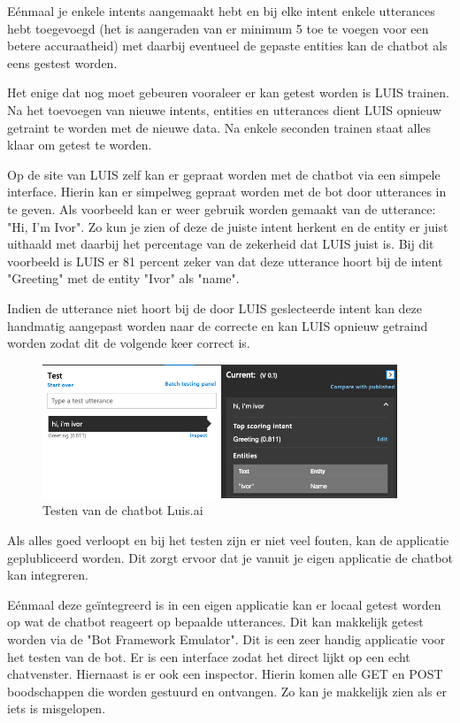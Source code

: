 Eénmaal je enkele intents aangemaakt hebt en bij elke intent enkele utterances hebt toegevoegd (het is aangeraden van er minimum 5 toe te voegen voor een betere accuraatheid) met daarbij eventueel de gepaste entities kan de chatbot als eens gestest worden.

Het enige dat nog moet gebeuren vooraleer er kan getest worden is LUIS trainen. Na het toevoegen van nieuwe intents, entities en utterances dient LUIS opnieuw getraint te worden met de nieuwe data. Na enkele seconden trainen staat alles klaar om getest te worden.

Op de site van LUIS zelf kan er gepraat worden met de chatbot via een simpele interface. Hierin kan er simpelweg gepraat worden met de bot door utterances in te geven. Als voorbeeld kan er weer gebruik worden gemaakt van de utterance: "Hi, I'm Ivor". Zo kun je zien of deze de juiste intent herkent en de entity er juist uithaald met daarbij het percentage van de zekerheid dat LUIS juist is. Bij dit voorbeeld is LUIS er 81 percent zeker van dat deze utterance hoort bij de intent "Greeting" met de entity "Ivor" als "name".

Indien de utterance niet hoort bij de door LUIS geslecteerde intent kan deze handmatig aangepast worden naar de correcte en kan LUIS opnieuw getraind worden zodat dit de volgende keer correct is.

\begin{figure}[h!]
	\centering
	\includegraphics[height=4cm]{img/test.png}
	\caption{Testen van de chatbot Luis.ai}
	\label{fig:test}
\end{figure}

Als alles goed verloopt en bij het testen zijn er niet veel fouten, kan de applicatie geplubliceerd worden. Dit zorgt ervoor dat je vanuit je eigen applicatie de chatbot kan integreren.

Eénmaal deze geïntegreerd is in een eigen applicatie kan er locaal getest worden op wat de chatbot reageert op bepaalde utterances. Dit kan makkelijk getest worden via de "Bot Framework Emulator". Dit is een zeer handig applicatie voor het testen van de bot. Er is een interface zodat het direct lijkt op een echt chatvenster. Hiernaast is er ook een inspector. Hierin komen alle GET en POST boodschappen die worden gestuurd en ontvangen. Zo kan je makkelijk zien als er iets is misgelopen.

